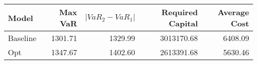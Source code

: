 \begin{tabular}{lrrrr}
\toprule
    Model &  Max VaR &  $|VaR_2 - VaR_1|$ &  Required Capital &  Average Cost \\
\midrule
 Baseline &  1301.71 &            1329.99 &        3013170.68 &       6408.09 \\
      Opt &  1347.67 &            1402.60 &        2613391.68 &       5630.46 \\
\bottomrule
\end{tabular}
